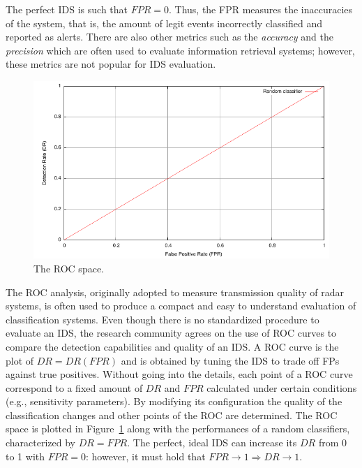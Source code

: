 \noindent The perfect \ac{IDS} is such that $FPR = 0$. Thus, the
\ac{FPR} measures the inaccuracies of the system, that is, the amount
of legit events incorrectly classified and reported as alerts. There
are also other metrics such as the \emph{accuracy} and the
\emph{precision} which are often used to evaluate information
retrieval systems; however, these metrics are not popular for \ac{IDS}
evaluation.

\begin{figure}[tt]
  \centering
  \includegraphics[width=.8\textwidth]{figures/detection/roc-space}
  \caption{The \ac{ROC} space.}
  \label{fig:roc-space}
\end{figure}

The \ac{ROC} analysis, originally adopted to measure transmission
quality of radar systems, is often used to produce a compact and easy
to understand evaluation of classification systems. Even though there
is no standardized procedure to evaluate an \ac{IDS}, the research
community agrees on the use of \ac{ROC} curves to compare the
detection capabilities and quality of an \ac{IDS}. A \ac{ROC} curve is
the plot of $DR = DR(FPR)$ and is obtained by tuning the \ac{IDS} to
trade off \acp{FP} against true positives. Without going
into the details, each point of a \ac{ROC} curve correspond to a fixed
amount of $DR$ and $FPR$ calculated under certain conditions (e.g.,
sensitivity parameters). By modifying its configuration the quality of
the classification changes and other points of the \ac{ROC} are
determined. The \ac{ROC} space is plotted in
Figure~\ref{fig:roc-space} along with the performances of a random
classifiers, characterized by $DR = FPR$. The perfect, ideal \ac{IDS}
can increase its $DR$ from 0 to 1 with $FPR = 0$: however, it must
hold that $FPR \to 1 \Rightarrow DR \to 1$.

